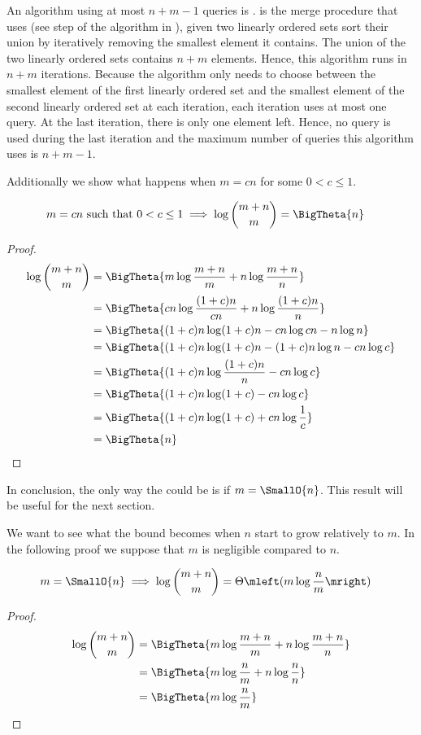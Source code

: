 An algorithm using at most \(n+m-1\) queries is \tapemerge. \tapemerge is the
merge procedure that \mergesort uses (see step  of the \mergesort
algorithm in ), \ie given two linearly ordered sets sort
their union by iteratively removing the smallest element it contains. The union
of the two linearly ordered sets contains \(n+m\) elements. Hence, this
algorithm runs in \(n+m\) iterations. Because the algorithm only needs to
choose between the smallest element of the first linearly ordered set and the
smallest element of the second linearly ordered set at each iteration, each
iteration uses at most one query. At the last iteration, there is only one
element left. Hence, no query is used during the last iteration and the maximum
number of queries this algorithm uses is \(n+m-1\).

Additionally we show what happens when \(m = c n\) for some \(0 < c \le 1\).
\begin{lemma}
\begin{align*}
m = c n \text{ such that } 0 < c \le 1 &\implies \log\binom{m+n}{m} = \BigTheta{n}
\end{align*}
\end{lemma}
\begin{proof}
\begin{align*}
\log\binom{m+n}{m} &= \BigTheta{m \log\frac{m+n}{m} + n \log\frac{m+n}{n}}\\
&= \BigTheta{cn \log\frac{(1+c)n}{cn} + n \log\frac{(1+c)n}{n}}\\
&= \BigTheta{(1+c)n \log (1+c)n - cn \log cn - n \log n}\\
&= \BigTheta{(1+c)n \log (1+c)n - (1+c)n \log n - cn \log c}\\
&= \BigTheta{(1+c)n \log \frac{(1+c)n}{n} - cn \log c}\\
&= \BigTheta{(1+c)n \log (1+c) - cn \log c}\\
&= \BigTheta{(1+c)n \log (1+c) + cn \log \frac{1}{c}}\\
&= \BigTheta{n}\qedhere
\end{align*}
\end{proof}

In conclusion, the only way the \ITLB could be  is if \(m =
\SmallO{n}\). This result will be useful for the next section.

We want to see what the bound becomes when $n$ start to grow relatively to
$m$. In the following proof we suppose that $m$ is negligible compared to $n$.
\begin{lemma}
\begin{align*}
m = \SmallO{n} &\implies \log\binom{m+n}{m} = \Theta\mleft(m \log\frac{n}{m}\mright)
\end{align*}
\end{lemma}
\begin{proof}
\begin{align*}
\log\binom{m+n}{m} &= \BigTheta{m \log\frac{m+n}{m} + n \log\frac{m+n}{n}}\\
&= \BigTheta{m \log\frac{n}{m} + n \log\frac{n}{n}}\\
&= \BigTheta{m \log\frac{n}{m}}\qedhere
\end{align*}
\end{proof}


